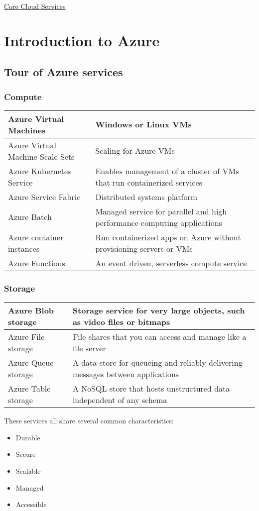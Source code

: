 \documentclass{article}[18pt]
\begin{document}
\begin{center}
\underline{\huge Core Cloud Services}
\end{center}
\section{Introduction to Azure}
\subsection{Tour of Azure services}
\subsubsection{Compute}
{\renewcommand{\arraystretch}{2}
	\begin{tabularx}{\textwidth}{X X}
		
		Azure Virtual Machines & Windows or Linux VMs\\
		\hline
		Azure Virtual Machine Scale Sets & Scaling for Azure VMs\\
		\hline
		Azure Kubernetes Service& Enables management of a cluster of VMs that run containerized services\\
		\hline
		Azure Service Fabric&Distributed systems platform\\
		\hline
		Azure Batch& Managed service for parallel and high performance computing applications\\
		\hline
		Azure container instances& Run containerized apps on Azure without provisioning servers or VMs\\
		\hline
		Azure Functions& An event driven, serverless compute service
		
	\end{tabularx}
}

\subsubsection{Storage}
{\renewcommand{\arraystretch}{2}
	\begin{tabularx}{\textwidth}{X X}
		
		Azure Blob storage& Storage service for very large objects, such as video files or bitmaps\\
		\hline
		Azure File storage& File shares that you can access and manage like a file server\\
		\hline
		Azure Queue storage& A data store for queueing and reliably delivering messages between applications\\
		\hline
		Azure Table storage& A NoSQL store that hosts unstructured data independent of any schema
		
	\end{tabularx}
}
These services all share several common characteristics:
\begin{itemize}
	\item Durable
	\item Secure
	\item Scalable
	\item Managed
	\item Accessible
\end{itemize}
\end{document}
